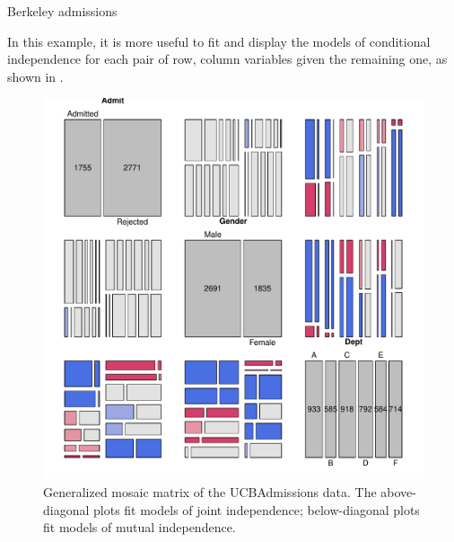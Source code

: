 \documentclass[11pt]{book}
\renewenvironment{knitrout}{\small\renewcommand{\baselinestretch}{.85}}{} %
\begin{document}
\begin{Example}[berkeley4b]{Berkeley admissions}
\begin{knitrout}
\end{knitrout}

In this example, it is more useful to fit and display the models of conditional independence
for each pair of row, column variables given the remaining one, as shown in .
\begin{knitrout}
\color{fgcolor}\begin{kframe}
\begin{alltt}
       \hlstd{=} \hlstd{(} \hlstd{=} \hlstd{,} \hlstd{=}\hlstd{),}
       \hlstd{=} \hlstd{(} \hlstd{=} \hlstd{,} \hlstd{=}\hlstd{),}
      \hlstd{=}\hlstd{)}
\end{alltt}
\end{kframe}\begin{figure}[!htb]


\centerline{\includegraphics[width=.8\textwidth]{ch05/fig/berk-pairs3} }

\caption[Generalized mosaic matrix of the UCBAdmissions data]{Generalized mosaic matrix of the UCBAdmissions data. The above-diagonal plots fit models of joint independence; below-diagonal plots fit models of mutual independence.\label{fig:berk-pairs3}}
\end{figure}



\end{knitrout}
\end{Example}
\end{document}
